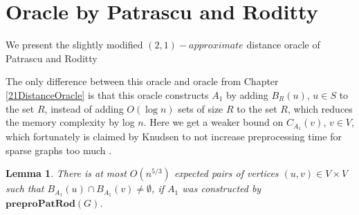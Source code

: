 \documentclass[shortabstract, lic, english]{iithesis}
\theoremstyle{definition} \newtheorem{definition}{Definition}[chapter]
\theoremstyle{plain} \newtheorem{remark}[definition]{Observation}
\theoremstyle{plain} \newtheorem{theorem}[definition]{Theorem}
\theoremstyle{plain} \newtheorem{lemma}[definition]{Lemma}
\theoremstyle{plain} \newtheorem{conjecture}[definition]{Conjecture}
\DeclarePairedDelimiter{\ceil}{\lceil}{\rceil}
\begin{document}
\section{Oracle by Patrascu and Roditty} \label{21OraclePatRod}

We present the slightly modified $(2,1)-approximate$ distance oracle of Patrascu and Roditty \cite{21OracleLessMemory}

\noindent{}

The only difference between this oracle and oracle from Chapter \ref{21DistanceOracle} is that this oracle
constructs $A_1$ by adding $B_R(u)$, $u \in S$ to the set $R$, instead of adding $O(\log n)$ sets of size $R$ to the set $R$, which reduces the memory complexity by log $n$.
Here we get a weaker bound on $C_{A_1}(v)$, $v \in V$, which fortunately is claimed by Knudsen to not increase preprocessing time for sparse graphs too much \cite[Chapter 4, Lemma 10]{21OracleSpannerNoPenaltyNoLog}.

\begin{lemma} \label{patRodBallIntersections}
    There is at most $O(n^{5/3})$ expected pairs of vertices $(u, v) \in V \times V$
    such that $B_{A_1}(u) \cap B_{A_1}(v) \neq \emptyset$,
    if $A_1$ was constructed by $\mathbf{preproPatRod}(G)$.
\end{lemma}
\end{document}
